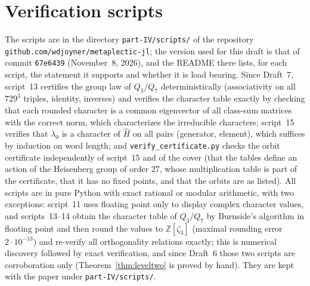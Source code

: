\documentclass[11pt]{article}
\newcommand{\Z}{\mathbb Z}
\theoremstyle{plain}
\theoremstyle{definition}
\begin{document}
\section{Verification scripts}\label{app:scripts}
The scripts are in the directory \texttt{part-IV/scripts/} of the
repository \texttt{github.com/wdjoyner/metaplectic-jl}; the version used
for this draft is that of commit \texttt{67e6439} (November~8, 2026), and the README there
lists, for each script, the statement it supports and whether it is
load bearing.  Since Draft~7, script~13 certifies the group law of
$Q_3/Q_7$ deterministically (associativity on all $729^3$ triples,
identity, inverses) and verifies the character table exactly by checking
that each rounded character is a common eigenvector of all class-sum
matrices with the correct norm, which characterizes the irreducible
characters; script~15 verifies that $\lambda_0$ is a character of
$\hat H$ on all pairs (generator, element), which suffices by induction
on word length; and \texttt{verify\_certificate.py} checks the orbit
certificate independently of script~15 and of the cover (that the
tables define an action of the Heisenberg group of order $27$, whose
multiplication table is part of the certificate, that it has no fixed
points, and that the orbits are as listed).
All scripts are in pure Python with exact rational or modular
arithmetic, with two exceptions: script~11 uses floating point only to
display complex character values, and scripts~13--14 obtain the
character table of $Q_3/Q_7$ by Burnside's algorithm in floating point
and then round the values to $\Z[\zeta_3]$ (maximal rounding error
$2\cdot10^{-13}$) and re-verify all orthogonality relations exactly;
this is numerical discovery followed by exact verification, and since
Draft~6 those two scripts are corroboration only
(Theorem~\ref{thm:leveltwo} is proved by hand).  They are kept with the
paper under \texttt{part-IV/scripts/}.
\end{document}
